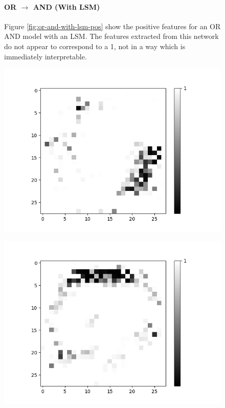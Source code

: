 \begin{figure}[H]
	\centering
	\begin{minipage}[t]{0.44\textwidth}
		\vspace{0.2cm}
		\paragraph{OR $\rightarrow$ AND (With LSM)} Figure \ref{fig:or-and-with-lsm-pos} show the positive features for an OR AND model with an LSM. 
The features extracted from this network do not appear to correspond to a 1, not in a way which is immediately interpretable. 
	\end{minipage}
	\hspace{1cm}
	\begin{minipage}[t]{0.44\textwidth}
		\vspace{0cm}
		\begin{minipage}[b]{0.49\textwidth}
		\captionsetup{labelformat=empty}
		\includegraphics[width=\textwidth]{OR-AND(W-LSM)(1)/Like/True/Layer0-Neuron-18.png}
		\label{}
	\end{minipage}
	\begin{minipage}[b]{0.49\textwidth}
		\captionsetup{labelformat=empty}
		\includegraphics[width=\textwidth]{OR-AND(W-LSM)(1)/Like/True/Layer0-Neuron-19.png}

\end{minipage}
\end{minipage}
\end{figure}
